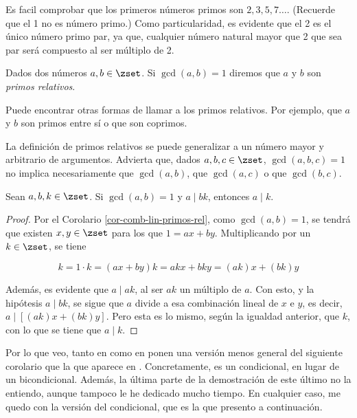 Es facil comprobar que los primeros números primos son $2, 3, 5, 7\ldots$.
(Recuerde que el 1 no es número primo.) Como particularidad, es evidente que
el 2 es el único número primo par, ya que, cualquier número natural mayor
que 2 que sea par será compuesto al ser múltiplo de 2.

\begin{deffinition}
  Dados dos números $a, b \in \zset$. Si $\gcd(a, b) = 1$ diremos que $a$ y
  $b$ son \emph{primos relativos}.
\end{deffinition}

Puede encontrar otras formas de llamar a los primos relativos. Por ejemplo,
que $a$ y $b$ son primos entre sí o que son coprimos.

La definición de primos relativos se puede generalizar a un número mayor y
arbitrario de argumentos. Advierta que, dados $a, b, c \in \zset$, $\gcd(a,
b, c) = 1$ no implica necesariamente que $\gcd(a, b)$, que $\gcd(a, c)$ o
que $\gcd(b, c)$.

\begin{lemma}[de Euclides]\label{th-lema-euclides}
  Sean $a, b, k \in \zset$. Si $\gcd(a, b) = 1$ y $a \mid bk$, entonces $a
  \mid k$.
\end{lemma}

\begin{proof}
  Por el Corolario \ref{cor-comb-lin-primos-rel}, como $\gcd(a, b) = 1$, se
  tendrá que existen $x, y \in \zset$ para los que $1 = ax + by$.
  Multiplicando por un $k \in \zset$, se tiene

  $$ k = 1 \cdot k = (ax + by)k = akx + bky = (ak)x + (bk)y $$

  Además, es evidente que $a \mid ak$, al ser $ak$ un múltiplo de $a$. Con
  esto, y la hipótesis $a \mid bk$, se sigue que $a$ divide a esa
  combinación lineal de $x$ e $y$, es decir, $a \mid [(ak)x + (bk)y]$. Pero
  esta es lo mismo, según la igualdad anterior, que $k$, con lo que se tiene
  que $a \mid k$.
\end{proof}

Por lo que veo, tanto en \cite{burton} como en \cite{weissman} ponen una versión
menos general del siguiente corolario que la que aparece en \cite{texto-uned}.
Concretamente, es un condicional, en lugar de un bicondicional. Además, la
última parte de la demostración de este último no la entiendo, aunque tampoco le
he dedicado mucho tiempo. En cualquier caso, me quedo con la versión del
condicional, que es la que presento a continuación.

